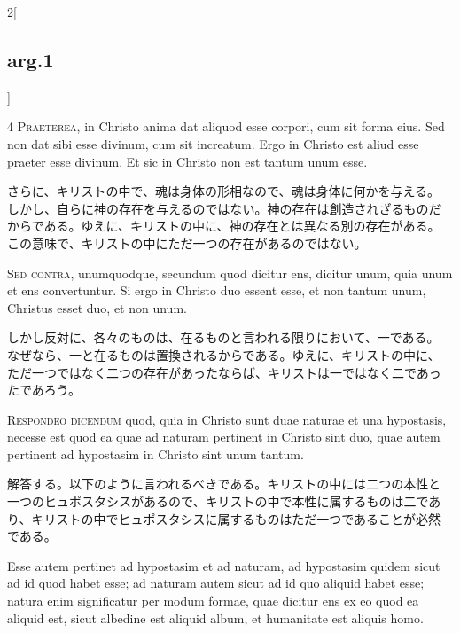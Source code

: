 \documentclass[paper=a4paper,fontsize=10pt,jafontsize=9pt,titlepage]{jlreq}
\begin{document}
\begin{paracol}{2}[\subsection{arg.1}]

{\scshape 4 Praeterea}, in Christo anima dat aliquod esse corpori, cum
sit forma eius. Sed non dat sibi esse divinum, cum sit increatum. Ergo
in Christo est aliud esse praeter esse divinum. Et sic in Christo non
est tantum unum esse.

\switchcolumn

さらに、キリストの中で、魂は身体の形相なので、魂は身体に何かを与える。
しかし、自らに神の存在を与えるのではない。神の存在は創造されざるものだ
からである。ゆえに、キリストの中に、神の存在とは異なる別の存在がある。
この意味で、キリストの中にただ一つの存在があるのではない。

\switchcolumn*[\subsection{s.c.}]

{\scshape Sed contra}, unumquodque, secundum quod dicitur ens, dicitur
unum, quia unum et ens convertuntur. Si ergo in Christo duo essent
esse, et non tantum unum, Christus esset duo, et non unum.

\switchcolumn

しかし反対に、各々のものは、在るものと言われる限りにおいて、一である。
なぜなら、一と在るものは置換されるからである。ゆえに、キリストの中に、
ただ一つではなく二つの存在があったならば、キリストは一ではなく二であっ
たであろう。


{\scshape Respondeo dicendum} quod, quia in Christo sunt duae naturae
et una hypostasis, necesse est quod ea quae ad naturam pertinent in
Christo sint duo, quae autem pertinent ad hypostasim in Christo sint
unum tantum.

\switchcolumn

解答する。以下のように言われるべきである。キリストの中には二つの本性と
一つのヒュポスタシスがあるので、キリストの中で本性に属するものは二であ
り、キリストの中でヒュポスタシスに属するものはただ一つであることが必然
である。

\switchcolumn*

Esse autem pertinet ad hypostasim et ad naturam, ad hypostasim quidem
sicut ad id quod habet esse; ad naturam autem sicut ad id quo aliquid
habet esse; natura enim significatur per modum formae, quae dicitur
ens ex eo quod ea aliquid est, sicut albedine est aliquid album, et
humanitate est aliquis homo.


\end{paracol}
\end{document}

